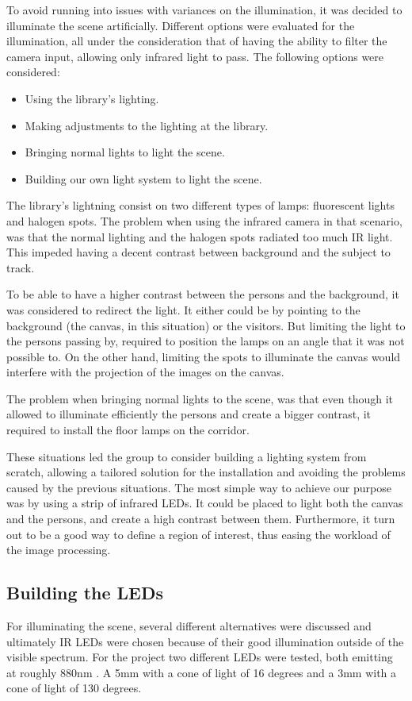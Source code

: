 To avoid running into issues with variances on the illumination, it was decided to illuminate the scene artificially. Different options were evaluated for the illumination, all under the consideration that of having the ability to filter the camera input, allowing only infrared light to pass. The following options were considered:

\begin{itemize}
\item Using the library's lighting.
\item Making adjustments to the lighting at the library.
\item Bringing normal lights to light the scene.
\item Building our own light system to light the scene.
\end{itemize}

The library's lightning consist on two different types of lamps: fluorescent lights and halogen spots. The problem when using the infrared camera in that scenario, was that the normal lighting and the halogen spots radiated too much IR light. This impeded having a decent contrast between background and the subject to track.

To be able to have a higher contrast between the persons and the background, it was considered to redirect the light. It either could be by pointing to the background (the canvas, in this situation) or the visitors. But limiting the light to the persons passing by, required to position the lamps on an angle that it was not possible to. On the other hand, limiting the spots to illuminate the canvas would interfere with the projection of the images on the canvas.

The problem when bringing normal lights to the scene, was that even though it allowed to illuminate efficiently the persons and create a bigger contrast, it required to install the floor lamps on the corridor.

These situations led the group to consider building a lighting system from scratch, allowing a tailored solution for the installation and avoiding the problems caused by the previous situations. The most simple way to achieve our purpose was by using a strip of infrared LEDs. It could be placed to light both the canvas and the persons, and create a high contrast between them. Furthermore, it turn out to be a good way to define a region of interest, thus easing the workload of the image processing.

\subsection{Building the LEDs}
For illuminating the scene, several different alternatives were discussed and ultimately IR LEDs were chosen  because of their good illumination outside of the visible spectrum. For the project two different LEDs were tested, both emitting at roughly 880nm \citep{5mm_led} \citep{3mm_led}. A 5mm with a cone of light of 16 degrees and a 3mm with a cone of light of 130 degrees.

